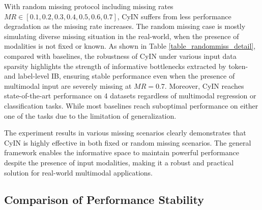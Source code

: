 \documentclass{article}
\begin{document}
With random missing protocol including missing rates $MR\in[0.1,0.2,0.3,0.4,0.5,0.6,0.7]$, CyIN suffers from less performance degradation as the missing rate increases. The random missing case is mostly simulating diverse missing situation in the real-world, when the presence of modalities is not fixed or known. As shown in Table \ref{table_randommiss_detail}, compared with baselines, the robustness of CyIN under various input data sparsity highlights the strength of informative bottlenecks extracted by token- and label-level IB, ensuring stable performance even when the presence of multimodal input are severely missing at $MR=0.7$. Moreover, CyIN reaches state-of-the-art performance on 4 datasets regardless of multimodal regression or classification tasks. While most baselines reach suboptimal performance on either one of the tasks due to the limitation of generalization.

The experiment results in various missing scenarios  clearly demonstrates that CyIN is highly effective in both fixed or random missing scenarios. The general  framework enables the informative space to maintain powerful performance despite the presence of input modalities, making it a robust and practical solution for real-world multimodal applications.



\subsection{Comparison of Performance Stability}
\label{appendix_stability}
\end{document}
